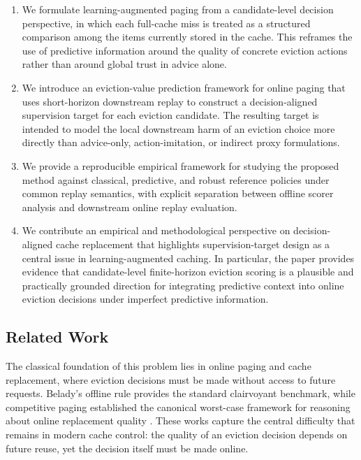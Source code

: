 \documentclass[preprint,12pt]{elsarticle}
\begin{document}
\begin{enumerate}
    \item We formulate learning-augmented paging from a candidate-level decision perspective, in which each full-cache miss is treated as a structured comparison among the items currently stored in the cache. This reframes the use of predictive information around the quality of concrete eviction actions rather than around global trust in advice alone.

    \item We introduce an eviction-value prediction framework for online paging that uses short-horizon downstream replay to construct a decision-aligned supervision target for each eviction candidate. The resulting target is intended to model the local downstream harm of an eviction choice more directly than advice-only, action-imitation, or indirect proxy formulations.

    \item We provide a reproducible empirical framework for studying the proposed method against classical, predictive, and robust reference policies under common replay semantics, with explicit separation between offline scorer analysis and downstream online replay evaluation.

    \item We contribute an empirical and methodological perspective on decision-aligned cache replacement that highlights supervision-target design as a central issue in learning-augmented caching. In particular, the paper provides evidence that candidate-level finite-horizon eviction scoring is a plausible and practically grounded direction for integrating predictive context into online eviction decisions under imperfect predictive information.
\end{enumerate}

\subsection{Related Work}
\label{subsec:related_work}

The classical foundation of this problem lies in online paging and cache replacement, where eviction decisions must be made without access to future requests. Belady's offline rule provides the standard clairvoyant benchmark, while competitive paging established the canonical worst-case framework for reasoning about online replacement quality \cite{belady1966replacement_algorithms,fiat1991competitive_paging}. These works capture the central difficulty that remains in modern cache control: the quality of an eviction decision depends on future reuse, yet the decision itself must be made online.
\end{document}
